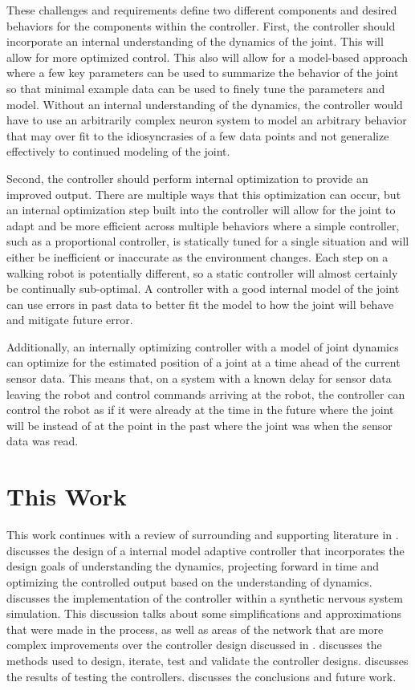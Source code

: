 These challenges and requirements define two different components and desired
behaviors for the components within the controller. First, the controller should
incorporate an internal understanding of the dynamics of the joint. This will
allow for more optimized control. This also will allow for a model-based
approach where a few key parameters can be used to summarize the behavior of the
joint so that minimal example data can be used to finely tune the parameters and
model. Without an internal understanding of the dynamics, the controller would have to
use an arbitrarily complex neuron system to model an arbitrary behavior that may
over fit to the idiosyncrasies of a few data points and not generalize
effectively to continued modeling of the joint.

Second, the controller should perform internal optimization to provide an
improved output. There are multiple ways that this optimization can occur, but
an internal optimization step built into the controller will allow for the joint
to adapt and be more efficient across multiple behaviors where a simple
controller, such as a proportional controller, is statically tuned for a single
situation and will either be inefficient or inaccurate as the environment
changes. Each step on a walking robot is potentially different, so a static
controller will almost certainly be continually sub-optimal. A controller with a good internal model of the joint can use errors in past data to better fit the model to how the joint will behave and mitigate future error.

Additionally, an internally optimizing controller with a model of joint dynamics can
optimize for the estimated position of a joint at a time ahead of the current
sensor data. This means that, on a system with a known delay for sensor data
leaving the robot and control commands arriving at the robot, the controller can
control the robot as if it were already at the time in the future where the
joint will be instead of at the point in the past where the joint was when the
sensor data was read.

\section{This Work}

This work continues with a review of surrounding and supporting literature in 
.  discusses the design of 
a internal model adaptive controller that incorporates the design goals of 
understanding the dynamics, projecting forward in time and optimizing the 
controlled output based on the understanding of dynamics.  discusses the implementation of the controller within a 
synthetic nervous system simulation. This discussion talks about some 
simplifications and approximations that were made in the process, as well as 
areas of the network that are more complex improvements over the controller 
design discussed in .  
discusses the methods used to design, iterate, test and validate the controller 
designs.  discusses the results of testing the controllers.
 discusses the conclusions and future work.
